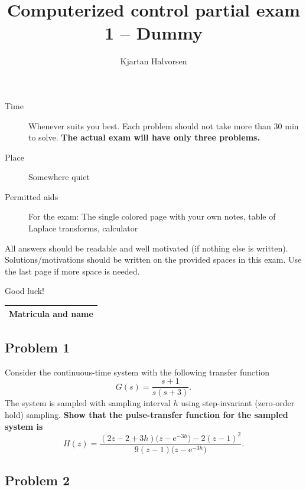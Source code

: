 \documentclass[a4paper,12pt]{article}
\title{Computerized control partial exam 1 -- Dummy}
\author{Kjartan Halvorsen}
\newcommand{\bmpl}{\begin{minipage}[t]{140mm}}
\newcommand{\emp}{\end{minipage}}
\newcommand*{\zethree}{\big(z - \mexp{-3h}\big)}
\newcommand*{\mexp}[1]{\ensuremath{\mathrm{e}^{#1}}}
\begin{document}
\maketitle


\begin{description}
\item[Time] Whenever suits you best. Each problem should not take more than 30 min to solve. \textbf{The actual exam will have only three problems.}
\item[Place] Somewhere quiet
\item[Permitted aids] For the exam: The single colored page with your own notes, table of Laplace transforms, calculator
\end{description}

All answers should be readable and well motivated (if nothing else is written). Solutions/motivations should be written on the provided spaces in this exam. Use the last page if more space is needed.

\begin{center}
{\Large Good luck!} \\
\end{center}

\begin{tabular}{|l|l|}
\hline
\multicolumn{2}{|l|}{\bmpl
Matricula and name
\vspace*{14mm}
\emp}\\
\hline

\end{tabular}

\clearpage

\subsection*{Problem 1}
Consider the continuous-time system with the following transfer function
\[ G(s) = \frac{s+1}{s(s+3)}. \]
The system is sampled with sampling interval $h$ using step-invariant (zero-order hold) sampling. \textbf{Show that the pulse-transfer function for the sampled system is}
\[ H(z) = \frac{(2z-2+3h)\zethree{} - 2(z-1)^2}{9(z-1)\zethree{}}. \]

\noindent
\fbox{
\bmpl
{\bf Derivation:}\\
\vspace*{130mm}
\emp}

\clearpage
\subsection*{Problem 2}
\end{document}

